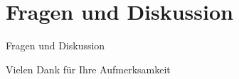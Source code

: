 \section{Fragen und Diskussion}
\begin{frame}[t]{Fragen und Diskussion}
\end{frame}

\begin{frame}[t]{Vielen Dank für Ihre Aufmerksamkeit}
\end{frame}
